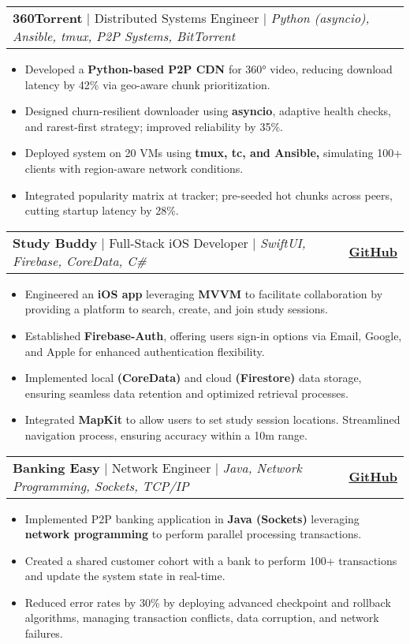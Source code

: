 \documentclass[letterpaper,11pt]{article}
\makeatletter
\newcommand{\resumeItem}[1]{
  \item\small{\fontsize{10}{11}\selectfont
    {#1 \vspace{-1pt}}
  }
}
\newcommand{\resumeProjectHeading}[2]{
    \item
    \begin{tabular*}{0.97\textwidth}{l@{\extracolsep{\fill}}r}
      {\small#1} & {\small#2} \\
    \end{tabular*}\vspace{-6pt}
}
\newcommand{\resumeItemListStart}{\begin{itemize}[leftmargin=0.20in]}
\newcommand{\resumeItemListEnd}{\end{itemize}\vspace{-6pt}}
\newcommand{\projectHeadingColor}{\color{Blue}}
\newcommand{\github}{\color{Blue}\textbf{GitHub}}
\makeatother
\begin{document}
    \resumeProjectHeading
    {\projectHeadingColor\textbf{360Torrent} $|$ {Distributed Systems Engineer} $|$ \emph{\color{Black} Python (asyncio), Ansible, tmux, P2P Systems, BitTorrent}}{}
    \resumeItemListStart
        \resumeItem{Developed a \textbf{Python-based P2P CDN} for 360° video, reducing download latency by 42\% via geo-aware chunk prioritization.}
        \resumeItem{Designed churn-resilient downloader using \textbf{asyncio}, adaptive health checks, and rarest-first strategy; improved reliability by 35\%.}
        \resumeItem{Deployed system on 20 VMs using \textbf{tmux, tc, and Ansible,} simulating 100+ clients with region-aware network conditions.}
        \resumeItem{Integrated popularity matrix at tracker; pre-seeded hot chunks across peers, cutting startup latency by 28\%.}
    \resumeItemListEnd

    \resumeProjectHeading
    {\projectHeadingColor\textbf{Study Buddy} $|$ {Full-Stack iOS Developer} $|$ \emph{\color{Black}SwiftUI, Firebase, CoreData, C\#}}{\href{https://github.com/sjain166/StudyBuddy}{\github}}
    \resumeItemListStart
        \resumeItem{Engineered an \textbf{iOS app} leveraging \textbf{MVVM} to facilitate collaboration by providing a platform to search, create, and join study sessions.}
        \resumeItem{Established \textbf{Firebase-Auth}, offering users sign-in options via Email, Google, and Apple for enhanced authentication flexibility.}
        \resumeItem{Implemented local \textbf{(CoreData)} and cloud \textbf{(Firestore)} data storage, ensuring seamless data retention and optimized retrieval processes.}
        \resumeItem{Integrated \textbf{MapKit} to allow users to set study session locations. Streamlined navigation process, ensuring accuracy within a 10m range.}
    \resumeItemListEnd

    \resumeProjectHeading
    {\projectHeadingColor\textbf{Banking Easy} $|$ {Network Engineer} $|$ \emph{\color{Black}Java, Network Programming, Sockets, TCP/IP}}{\href{https://github.com/sjain166/CSE-434-Socket_Project}{\github}}
    \resumeItemListStart
        \resumeItem{Implemented P2P banking application in \textbf{Java (Sockets)} leveraging \textbf{network programming} to perform parallel processing transactions.}
        \resumeItem{Created a shared customer cohort with a bank to perform 100+ transactions and update the system state in real-time.}
        \resumeItem{Reduced error rates by 30\% by deploying advanced checkpoint and rollback algorithms, managing transaction conflicts, data corruption, and network failures.}
    \resumeItemListEnd
\end{document}
